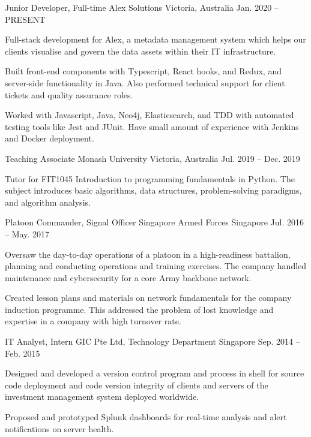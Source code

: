 \begin{cventries}
\cventry
    {Junior Developer, Full-time}
    {Alex Solutions}
    {Victoria, Australia}
    {Jan. 2020 – PRESENT}
    {
      \begin{cvitems}
 		\item {Full-stack development for Alex, a metadata management system which helps our clients visualise and govern the data assets within their IT infrastructure.}
        \item {Built front-end components with Typescript, React hooks, and Redux, and server-side functionality in Java. Also performed technical support for client tickets and quality assurance roles.}
        \item {Worked with Javascript, Java, Neo4j, Elasticsearch, and TDD with automated testing tools like Jest and JUnit. Have small amount of experience with Jenkins and Docker deployment.}
      \end{cvitems}
    }
	\cventry
    {Teaching Associate}
    {Monash University}
    {Victoria, Australia}
    {Jul. 2019 – Dec. 2019}
    {
      \begin{cvitems}
        \item {Tutor for FIT1045 Introduction to programming fundamentals in Python. The subject introduces basic algorithms, data structures, problem-solving paradigms, and algorithm analysis.}
      \end{cvitems}
    }
  \cventry
    {Platoon Commander, Signal Officer}
    {Singapore Armed Forces}
    {Singapore}
    {Jul. 2016 – May. 2017}
    {
      \begin{cvitems}
        \item {Oversaw the day-to-day operations of a platoon in a high-readiness battalion, planning and conducting operations and training exercises. The company handled maintenance and cybersecurity for a core Army backbone network.}
        \item {Created lesson plans and materials on network fundamentals for the company induction programme. This addressed the problem of lost knowledge and expertise in a company with high turnover rate.}
      \end{cvitems}
    }
  \cventry
    {IT Analyst, Intern}
    {GIC Pte Ltd, Technology Department}
    {Singapore}
    {Sep. 2014 – Feb. 2015}
    {
      \begin{cvitems}
        \item {Designed and developed a version control program and process in shell for source code deployment and code version integrity of clients and servers of the investment management system deployed worldwide.}
        \item {Proposed and prototyped Splunk dashboards for real-time analysis and alert notifications on server health.}
      \end{cvitems} 
    }
\end{cventries}
